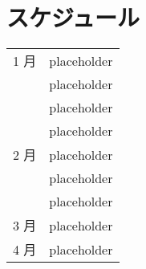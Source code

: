 \section{スケジュール}
\begin{table}[H]
  \begin{tabular}{ll}
    1 月 & placeholder \\
         & placeholder \\
         & placeholder \\
         & placeholder \\
    2 月 & placeholder \\
         & placeholder \\
         & placeholder \\
    3 月 & placeholder \\
    4 月 & placeholder \\
  \end{tabular}
\end{table}
